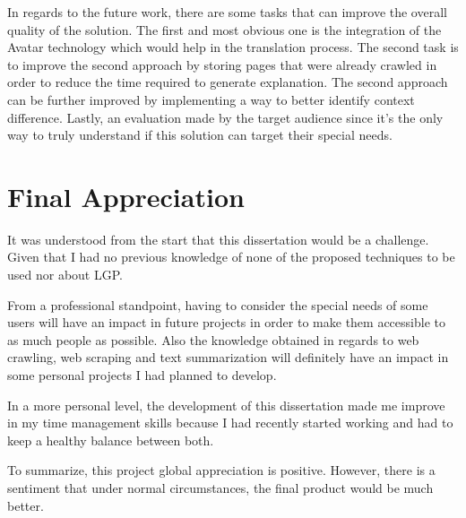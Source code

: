 In regards to the future work, there are some tasks that can improve the overall quality of the solution.
The first and most obvious one is the integration of the Avatar technology which would help in the translation process.
The second task is to improve the second approach by storing pages that were already crawled in order to reduce the time required to generate explanation.
The second approach can be further improved by implementing a way to better identify context difference.
Lastly, an evaluation made by the target audience since it's the only way to truly understand if this solution can target their special needs.

\section{Final Appreciation}

It was understood from the start that this dissertation would be a challenge.
Given that I had no previous knowledge of none of the proposed techniques to be used nor about \gls{LGP}.

From a professional standpoint, having to consider the special needs of some users will have an impact in future projects in order to make them accessible to as much people as possible.
Also the knowledge obtained in regards to web crawling, web scraping and text summarization will definitely have an impact in some personal projects I had planned to develop.

In a more personal level, the development of this dissertation made me improve in my time management skills because I had recently started working and had to keep a healthy balance between both.

To summarize, this project global appreciation is positive.
However, there is a sentiment that under normal circumstances, the final product would be much better.
